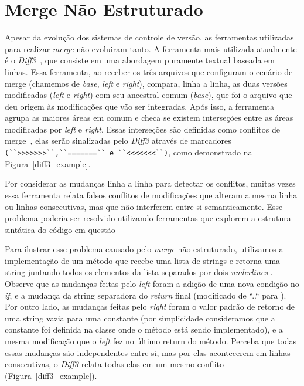 \section{Merge Não Estruturado}
Apesar da evolução dos sistemas de controle de versão, as ferramentas
utilizadas para realizar \emph{merge} não evoluiram tanto. A ferramenta mais
utilizada atualmente é o \emph{Diff3}~\cite{mens02}, que consiste em uma
abordagem puramente textual baseada em linhas. Essa ferramenta, ao receber os
três arquivos que configuram o cenário de merge (chamemos de \emph{base},
\emph{left} e \emph{right}), compara, linha a linha, as duas versões
modificadas (\emph{left} e \emph{right}) com seu ancestral comum (\emph{base}),
que foi o arquivo que deu origem às modificações que vão ser integradas. Após
isso, a ferramenta agrupa as maiores áreas em comum e checa se existem
interseções entre as áreas modificadas por \emph{left} e \emph{right}. Essas
interseções são definidas como conflitos de merge~\cite{khan07}, elas serão
sinalizadas pelo \emph{Diff3} através de marcadores
\verb|(``>>>>>>>``,``=======`` e ``<<<<<<<``)|, como demonstrado na
Figura~\ref{diff3_example}.

Por considerar as mudanças linha a linha para detectar os conflitos, muitas
vezes essa ferramenta relata falsos conflitos de modificações que alteram a
mesma linha ou linhas consecutivas, mas que não interferem entre si
semanticamente. Esse problema poderia ser resolvido utilizando ferramentas que
explorem a estrutura sintática do código em questão~\cite{cavalcanti19}

Para ilustrar esse problema causado pelo \emph{merge} não estruturado,
utilizamos a implementação de um método  que recebe uma
lista de strings e retorna uma string juntando todos os elementos da lista
separados por dois \emph{underlines} . Observe que as
mudanças feitas pelo \emph{left} foram a adição de uma nova condição no
\emph{if}, e a mudança da string separadora do \emph{return} final (modificado
de ``..`` para ). Por outro lado, as mudanças feitas pelo
\emph{right} foram o valor padrão de retorno de uma string vazia para uma
constante (por simplicidade consideramos que a constante foi definida na classe
onde o método está sendo implementado), e a mesma modificação que o \emph{left}
fez no último return do método. Perceba que todas essas mudanças são
independentes entre si, mas por elas acontecerem em linhas consecutivas, o
\emph{Diff3} relata todas elas em um mesmo conflito
(Figura~\ref{diff3_example}).

